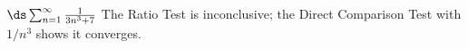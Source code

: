 {$\ds\sum_{n=1}^\infty \frac{1}{3n^3+7}$
}
{The Ratio Test is inconclusive; the Direct Comparison Test with $1/n^3$ shows it converges.
}
